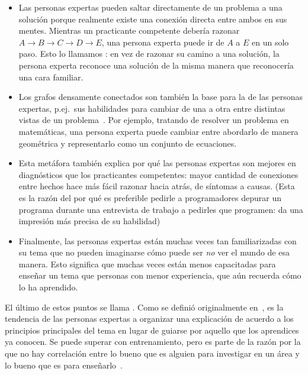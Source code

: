 \begin{itemize}

\item
  Las personas expertas pueden saltar directamente de un problema a una solución
  porque realmente existe una conexión directa entre ambos en sus mentes.
  Mientras un practicante competente debería razonar
  $A{\rightarrow}B{\rightarrow}C{\rightarrow}D{\rightarrow}E$,
  una persona experta puede ir de $A$ a $E$ en un solo paso.
  Esto lo llamamos :
  en vez de razonar su camino a una solución,
  la persona experta reconoce una solución de la misma manera que reconocería una cara familiar.

\item
  Los grafos densamente conectados son también la base para la 
   de las personas expertas,
 p.ej.\ sus habilidades para cambiar de una a otra entre distintas vistas de un problema~\cite{Petr2016}.
  Por ejemplo,
  tratando de resolver un problema en matemáticas,
  una persona experta puede cambiar entre abordarlo de manera geométrica 
  y representarlo como un conjunto de ecuaciones.

\item
  Esta metáfora también explica por qué las personas expertas son mejores en diagnósticos que los practicantes competentes:
 mayor cantidad de conexiones entre hechos hace más fácil razonar hacia atrás, de síntomas a causas.
  (Esta es la razón del por qué es preferible pedirle a programadores depurar un programa durante una entrevista de trabajo a pedirles que programen: da una impresión más precisa de su habilidad)

\item
  Finalmente,
  las personas expertas están muchas veces tan familiarizadas con su tema que
  no pueden imaginarse cómo puede ser \emph{no} ver el mundo de esa manera.
  Esto significa que muchas veces están menos capacitadas para enseñar un tema que  personas con menor experiencia, 
  que aún recuerda cómo lo ha aprendido.

\end{itemize}

El último de estos puntos se llama .
Como se definió originalmente en~\cite{Nath2003},
es la tendencia de las personas expertas a organizar una explicación de acuerdo a los principios principales del tema
en lugar de guiarse por aquello que los aprendices ya conocen.
Se puede superar con entrenamiento,
pero es parte de la razón por la que no hay correlación entre
lo bueno que es alguien para investigar en un área
y lo bueno que es para enseñarlo~\cite{Mars2002}.

